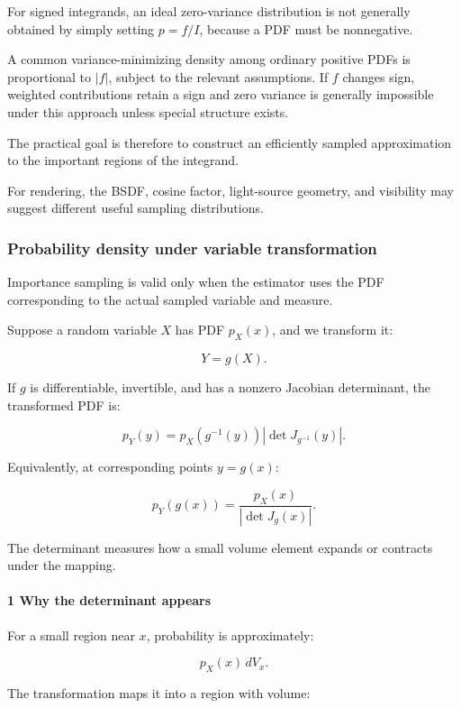 For signed integrands, an ideal zero-variance distribution is not generally obtained by simply setting \(p=f/I\), because a PDF must be nonnegative.

A common variance-minimizing density among ordinary positive PDFs is proportional to \(|f|\), subject to the relevant assumptions. If \(f\) changes sign, weighted contributions retain a sign and zero variance is generally impossible under this approach unless special structure exists.

The practical goal is therefore to construct an efficiently sampled approximation to the important regions of the integrand.

For rendering, the BSDF, cosine factor, light-source geometry, and visibility may suggest different useful sampling distributions.

\subsubsection{Probability density under variable transformation}\label{probability-density-under-variable-transformation}

Importance sampling is valid only when the estimator uses the PDF corresponding to the actual sampled variable and measure.

Suppose a random variable \(X\) has PDF \(p_X(x)\), and we transform it:

\[
 Y=g(X).
\]

If \(g\) is differentiable, invertible, and has a nonzero Jacobian determinant, the transformed PDF is:

\[
 \boxed{ p_Y(y) = p_X(g^{-1}(y)) \left|\det J_{g^{-1}}(y)\right| }.
\]

Equivalently, at corresponding points \(y=g(x)\):

\[
 \boxed{ p_Y(g(x)) = \frac{p_X(x)}{|\det J_g(x)|} }.
\]

The determinant measures how a small volume element expands or contracts under the mapping.

\paragraph{1 Why the determinant appears}\label{why-the-determinant-appears}

For a small region near \(x\), probability is approximately:

\[
 p_X(x)\,dV_x.
\]

The transformation maps it into a region with volume:

